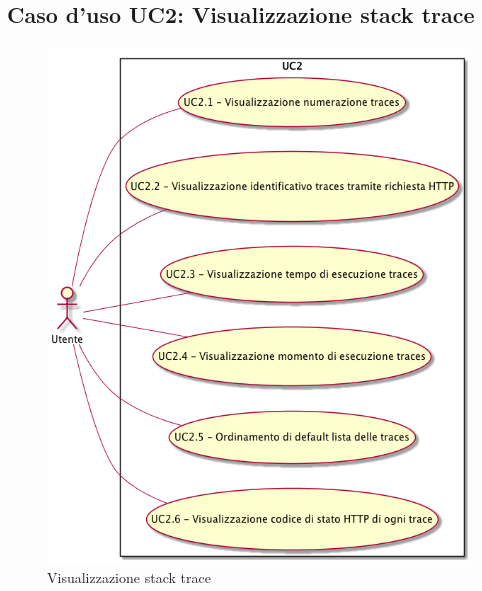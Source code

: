 \subsection{Caso d'uso UC2: Visualizzazione stack trace}
\begin{figure} [H]
\centering
\includegraphics[scale=0.45]{./UC/UC2.png}
\caption{Visualizzazione stack trace}\label{}
\end{figure}
